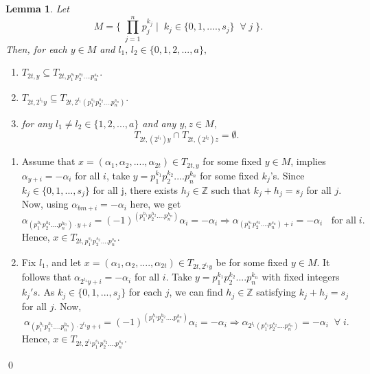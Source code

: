 \documentclass[a4paper,12pt]{amsart}
\renewenvironment{proof}{{\bfseries Proof.}}{\qed}
\numberwithin{equation}{section}
\newtheorem{lemma}[theorem]{Lemma}
\theoremstyle{definition}
\newcommand{\imp}{\Rightarrow}
\numberwithin{equation}{section}
\begin{document}
\begin{lemma}\label{2.6}
    Let $$M=\{ \;\prod_{j=1}^{n}p_j^{k_j} \mid \;k_j \in\{0, 1,...., s_j\} \;\;\forall\; j \;\}.$$ Then, for each $y \in M$ and $l_1,\,l_2 \in \{0, 1,2,..., a\},$ 
\begin{enumerate}
\item $T_{2t,y} \subseteq T_{2t,p_1^{s_1}p_2^{s_2}....p_n^{s_n}}.$
\item $T_{2t,2^{l_1}y} \subseteq T_{2t,2^{l_1}(p_1^{s_1}p_2^{s_2}....p_n^{s_n})}.$
\item for any $l_1 \neq l_2 \in \{1, 2,..., a\}$ and any $y, z \in M,$
     $$T_{2t,(2^{l_1})y} \cap T_{2t,(2^{l_2})z} = \emptyset.$$ 

\end{enumerate}
\end{lemma}
\begin{proof}
\begin{enumerate}
    \item Assume that $x =(\alpha_1,\alpha_2,....,\alpha_{2t})\in T_{2t,y}$ for some fixed $y \in M$, implies $\alpha_{y+i}=-\alpha_i$ for all $i$, take $y=p_1^{k_1}p_2^{k_2}....p_n^{k_n}$ for some fixed $k_j$'s. Since $k_j \in\{0,1,..., s_j\}$ for all j, there exists $h_j \in \mathbb{Z}$ such that $k_j +h_j =s_j $ for all $j$. Now, using $\alpha_{bm +i}=-\alpha_i$ here, we get
        $$ \alpha_{(p_1^{h_1}p_2^{h_2}....p_n^{h_n})\cdot y + i} =(-1)^{(p_1^{h_1}p_2^{h_2}....p_n^{h_n})}\alpha_i=-\alpha_i \imp \alpha_{(p_1^{s_1}p_2^{s_2}....p_n^{s_n}) + i} = -\alpha_i \;\;\text{ for all}\;i.$$ Hence, $x \in T_{2t,p_1^{s_1}p_2^{s_2}....p_n^{s_n}}.$

    \item Fix $l_1$, and let $x =(\alpha_1,\alpha_2,....,\alpha_{2t}) \in T_{2t, 2^{l_1}y}$ be for some fixed $y \in M$. It follows that $\alpha_{2^{l_1}y+i}=-\alpha_i$ for all $i$. Take $y=p_1^{k_1}p_2^{k_2}....p_n^{k_n}$ with fixed integers $k_j's$. As $k_j \in\{0,1,..., s_j\}$ for each $j$, we can find $h_j \in \mathbb{Z}$ satisfying $k_j +h_j =s_j $ for all $j$. Now,
    $$\alpha_{(p_1^{h_1}p_2^{h_2}....p_n^{h_n})\cdot 2^{l_1}y + i} =(-1)^{(p_1^{h_1}p_2^{h_2}....p_n^{h_n})}\alpha_i=-\alpha_i \imp \alpha_{2^{l_1}(p_1^{s_1}p_2^{s_2}....p_n^{s_n})} = -\alpha_i \;\;\forall\;i.$$ 
    Hence, $x \in T_{2t,2^{l_1}p_1^{s_1}p_2^{s_2}....p_n^{s_n}}.$


\end{enumerate}
\end{proof}
\end{document}
